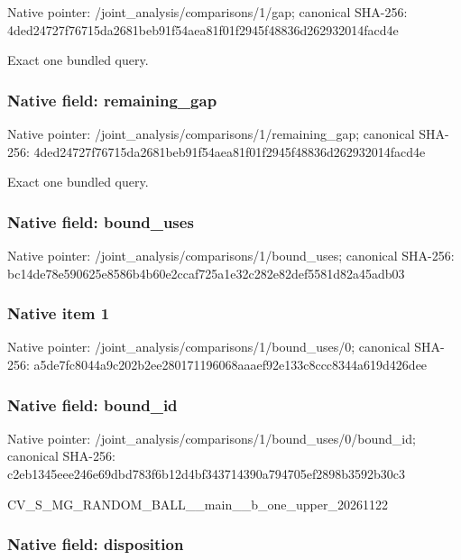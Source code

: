 \documentclass[10pt,a4paper]{article}
\begin{document}
Native pointer: /joint\_analysis/comparisons/1/gap; canonical SHA-256: 4ded24727f76715da2681beb\allowbreak{}91f54aea81f01f2945f48836\allowbreak{}d262932014facd4e


Exact one bundled query.


\subsubsection{Native field: remaining\_gap}


Native pointer: /joint\_analysis/comparis\allowbreak{}ons/1/remaining\_gap; canonical SHA-256: 4ded24727f76715da2681beb\allowbreak{}91f54aea81f01f2945f48836\allowbreak{}d262932014facd4e


Exact one bundled query.


\subsubsection{Native field: bound\_uses}


Native pointer: /joint\_analysis/comparis\allowbreak{}ons/1/bound\_uses; canonical SHA-256: bc14de78e590625e8586b4b6\allowbreak{}0e2ccaf725a1e32c282e82de\allowbreak{}f5581d82a45adb03



\subsubsection{Native item 1}


Native pointer: /joint\_analysis/comparis\allowbreak{}ons/1/bound\_uses/0; canonical SHA-256: a5de7fc8044a9c202b2ee280\allowbreak{}171196068aaaef92e133c8cc\allowbreak{}c8344a619d426dee



\subsubsection{Native field: bound\_id}


Native pointer: /joint\_analysis/comparis\allowbreak{}ons/1/bound\_uses/0/bound\allowbreak{}\_id; canonical SHA-256: c2eb1345eee246e69dbd783f\allowbreak{}6b12d4bf343714390a794705\allowbreak{}ef2898b3592b30c3


CV\_S\_MG\_RANDOM\_BALL\_\_mai\allowbreak{}n\_\_b\_one\_upper\_20261122


\subsubsection{Native field: disposition}
\end{document}

